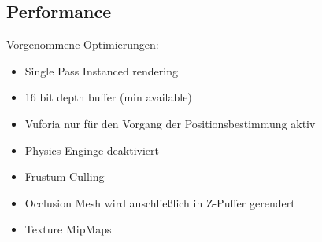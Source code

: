 \subsection{Performance}
Vorgenommene Optimierungen:
\begin{itemize}
	\item Single Pass Instanced rendering
	\item 16 bit depth buffer (min available)
	\item Vuforia nur für den Vorgang der Positionsbestimmung aktiv
	\item Physics Enginge deaktiviert
	\item Frustum Culling
	\item Occlusion Mesh wird auschließlich in Z-Puffer gerendert
	\item Texture MipMaps
\end{itemize}
